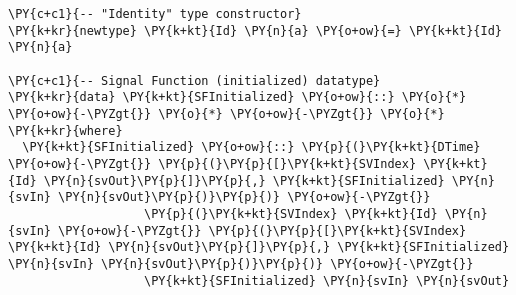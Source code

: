 \begin{Verbatim}[commandchars=\\\{\}]
\PY{c+c1}{-- "Identity" type constructor}
\PY{k+kr}{newtype} \PY{k+kt}{Id} \PY{n}{a} \PY{o+ow}{=} \PY{k+kt}{Id} \PY{n}{a}

\PY{c+c1}{-- Signal Function (initialized) datatype}
\PY{k+kr}{data} \PY{k+kt}{SFInitialized} \PY{o+ow}{::} \PY{o}{*} \PY{o+ow}{-\PYZgt{}} \PY{o}{*} \PY{o+ow}{-\PYZgt{}} \PY{o}{*} \PY{k+kr}{where}
  \PY{k+kt}{SFInitialized} \PY{o+ow}{::} \PY{p}{(}\PY{k+kt}{DTime} \PY{o+ow}{-\PYZgt{}} \PY{p}{(}\PY{p}{[}\PY{k+kt}{SVIndex} \PY{k+kt}{Id} \PY{n}{svOut}\PY{p}{]}\PY{p}{,} \PY{k+kt}{SFInitialized} \PY{n}{svIn} \PY{n}{svOut}\PY{p}{)}\PY{p}{)} \PY{o+ow}{-\PYZgt{}} 
                   \PY{p}{(}\PY{k+kt}{SVIndex} \PY{k+kt}{Id} \PY{n}{svIn} \PY{o+ow}{-\PYZgt{}} \PY{p}{(}\PY{p}{[}\PY{k+kt}{SVIndex} \PY{k+kt}{Id} \PY{n}{svOut}\PY{p}{]}\PY{p}{,} \PY{k+kt}{SFInitialized} \PY{n}{svIn} \PY{n}{svOut}\PY{p}{)}\PY{p}{)} \PY{o+ow}{-\PYZgt{}}
                   \PY{k+kt}{SFInitialized} \PY{n}{svIn} \PY{n}{svOut}
\end{Verbatim}
